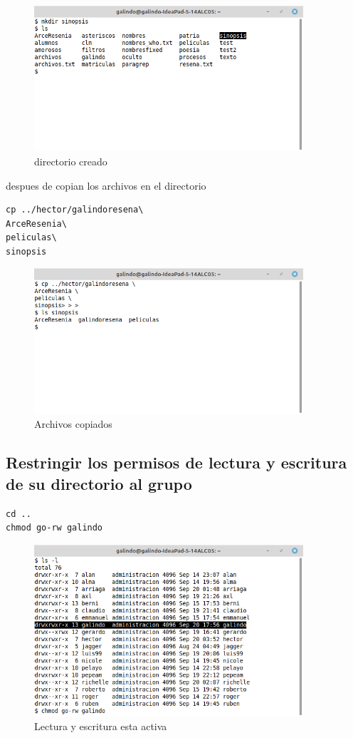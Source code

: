 \documentclass[11pt]{article}
\begin{document}
\begin{figure}[htbp]
\centering
\includegraphics[width=10cm]{img/bsd.png}
\caption{directorio creado}
\end{figure}

despues de copian los archivos en el directorio 

\begin{verbatim}
cp ../hector/galindoresena\
ArceResenia\
peliculas\
sinopsis
\end{verbatim}

\begin{figure}[htbp]
\centering
\includegraphics[width=10cm]{img/csd.png}
\caption{Archivos copiados}
\end{figure}

\pagebreak

\subsection{Restringir los permisos de lectura y escritura de su directorio al grupo}
\label{sec:org3fadf44}
\begin{verbatim}
cd ..
chmod go-rw galindo
\end{verbatim}

\begin{figure}[htbp]
\centering
\includegraphics[width=10cm]{img/b1.png}
\caption{Lectura y escritura esta activa}
\end{figure}
\end{document}

